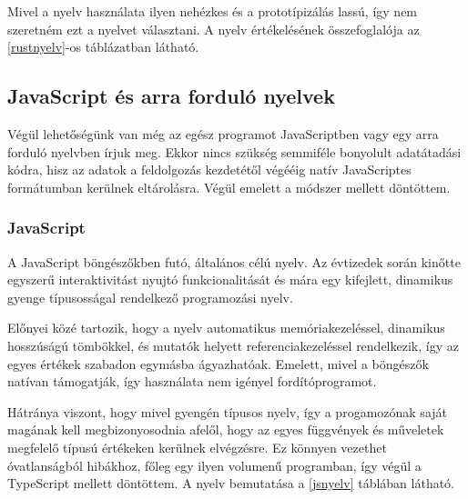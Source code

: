 Mivel a nyelv használata ilyen nehézkes és a prototípizálás lassú, így nem szeretném ezt a nyelvet választani. A nyelv értékelésének összefoglalója az \ref{rustnyelv}-os táblázatban látható.


\subsection{JavaScript és arra forduló nyelvek}

Végül lehetőségünk van még az egész programot JavaScriptben vagy egy arra forduló nyelvben írjuk meg. Ekkor nincs szükség semmiféle bonyolult adatátadási kódra, hisz az adatok a feldolgozás kezdetétől végééig natív JavaScriptes formátumban kerülnek eltárolásra. Végül emelett a módszer mellett döntöttem.

\subsubsection{JavaScript}

A JavaScript böngészőkben futó, általános célú nyelv. Az évtizedek során kinőtte egyszerű interaktivitást nyujtó funkcionalitását és mára egy kifejlett, dinamikus gyenge típusosságal rendelkező programozási nyelv.

Előnyei közé tartozik, hogy a nyelv automatikus memóriakezeléssel, dinamikus hosszúságú tömbökkel, és mutatók helyett referenciakezeléssel rendelkezik, így az egyes értékek szabadon egymásba ágyazhatóak. Emelett, mivel a böngészők natívan támogatják, így használata nem igényel fordítóprogramot.

Hátránya viszont, hogy mivel gyengén típusos nyelv, így a progamozónak saját magának kell megbizonyosodnia afelől, hogy az egyes függvények és műveletek megfelelő típusú értékeken kerülnek elvégzésre. Ez könnyen vezethet óvatlanságból hibákhoz, főleg egy ilyen volumenű programban, így végül a TypeScript mellett döntöttem. A nyelv bemutatása a \ref{jsnyelv} táblában látható.

